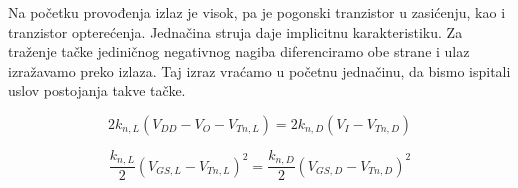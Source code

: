 Na početku provođenja izlaz je visok, pa je pogonski tranzistor u zasićenju, kao i tranzistor opterećenja. Jednačina struja daje implicitnu karakteristiku. Za traženje tačke jediničnog negativnog nagiba diferenciramo obe strane i ulaz izražavamo preko izlaza. Taj izraz vraćamo u početnu jednačinu, da bismo ispitali uslov postojanja takve tačke.

\[2k_{n,L}(V_{DD}-V_O-V_{Tn,L})=2k_{n,D}(V_I-V_{Tn,D})\]

\[\frac{k_{n,L}}2(V_{GS,L}-V_{Tn,L})^2=\frac{k_{n,D}}2(V_{GS,D}-V_{Tn,D})^2\]

